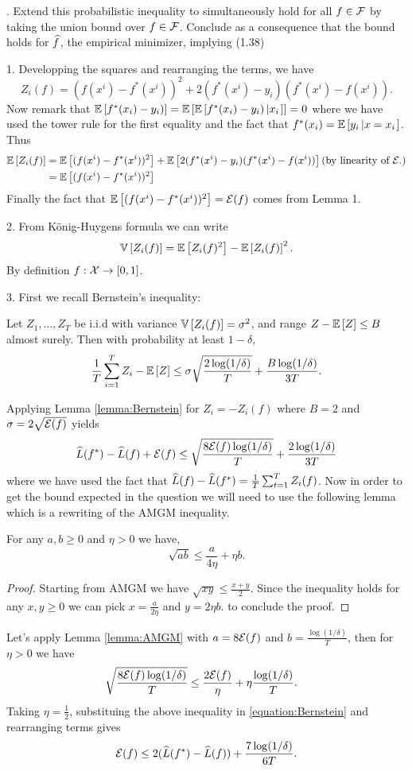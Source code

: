 . Extend this probabilistic inequality to simultaneously hold for all $f \in \mathcal{F}$ by taking the 
union bound over $f \in \mathcal{F}$. Conclude as a consequence that the bound holds for $\widehat f$, the empirical minimizer, implying (1.38)
\begin{solution}[]
1. Developping the squares and rearranging the terms, we have
   \[Z_i(f) = (f(x^i)-f^*(x^i))^2 +2(f^*(x^i)-y_i)(f^*(x^i)-f(x^i)).\] 
 Now remark that $\mathbb{E}\left[f^*(x_i)-y_i)\right]= \mathbb{E}\left[\mathbb{E}\left[f^*(x_i)-y_i)\left|x_i\right.\right]\right] = 0$ 
 where we have used the tower rule for the first equality and the fact that $f^*(x_i)=\mathbb{E}\left[y_i\left|x=x_i\right.\right]$.
Thus
\begin{align*}
    \mathbb{E}\left[Z_i(f)\right] &= \mathbb{E}\left[(f(x^i)-f^*(x^i))^2\right] + \mathbb{E}\left[2(f^*(x^i)-y_i)(f^*(x^i)-f(x^i))\right] \text{(by linearity of $\mathcal{E}{.}$)} \\
                &= \mathbb{E}\left[(f(x^i)-f^*(x^i))^2\right]
\end{align*}
Finally the fact that $\mathbb{E}\left[(f(x^i)-f^*(x^i))^2\right]= \mathcal{E}(f)$ comes from Lemma 1.

2. From König-Huygens formula we can write 
\[ \mathbb{V}\left[Z_i(f)\right]=\mathbb{E}\left[Z_i(f)^2\right]-\mathbb{E}\left[Z_i(f)\right]^2.\] 
By definition $f : \mathcal{X} \to [0,1]$.


3. First we recall Bernstein's inequality:
\begin{lemma}
    \label{lemma:Bernstein}
    Let $Z_1,\ldots,Z_T$ be i.i.d with variance $\mathbb{V}\left[Z_i(f)\right]=\sigma^2$, and range $Z-\mathbb{E}\left[Z\right]\leq B$ almost surely.
    Then with probability at least $1-\delta$,
    \[ \frac{1}{T}\sum_{i=1}^{T}Z_i -\mathbb{E}\left[Z\right]\leq \sigma\sqrt{\frac{2\log(1/\delta)}{T}}+\frac{B\log(1/\delta)}{3T}.\]
\end{lemma}
Applying Lemma \ref{lemma:Bernstein} for $Z_i=-Z_i(f)$ where $B= 2$ and $\sigma = 2\sqrt{\mathcal{E}(f)}$ yields    
\begin{equation}
    \label{equation:Bernstein}
    \widehat L(f^*)- \widehat L(f) + \mathcal{E}(f) \leq \sqrt{\frac{8\mathcal{E}(f)\log(1/\delta)}{T}}+\frac{2\log(1/\delta)}{3T}
\end{equation}
where we have used the fact that $\widehat L(f)-\widehat L(f^*) = \frac{1}{T}\sum_{t=1}^{T}Z_i(f)$.
Now in order to get the bound expected in the question we will need to use the following lemma which is a rewriting of the AMGM inequality.
\begin{lemma}
    \label{lemma:AMGM}
  For any $a,b\geq 0$ and $\eta >0$ we have,
  \[ \sqrt{ab} \leq \frac{a}{4\eta} +\eta b.\] 
\end{lemma}
\begin{proof}
    Starting from AMGM we have $\sqrt{xy} \leq \frac{x+y}{2}$.
    Since the inequality holds for any $x,y \geq 0$ we can pick $x = \frac{a}{2\eta}$ and $y=2\eta b$.
    to conclude the proof.
\end{proof}
Let's apply Lemma \ref{lemma:AMGM} with $a=8\mathcal{E}(f)$ and $b=\frac{\log(1/\delta)}{T}$, then for $\eta>0$ we have
\begin{align*}
    \sqrt{\frac{8\mathcal{E}(f)\log(1/\delta)}{T}}&\leq \frac{2\mathcal{E}(f)}{\eta} + \eta \frac{\log(1/\delta)}{T}.
\end{align*}
Taking $\eta=\frac{1}{2}$, substituing the above inequality in \ref{equation:Bernstein} and rearranging terms gives
\[ \mathcal{E}(f) \leq 2( \widehat L(f^*)- \widehat L(f))+\frac{7\log(1/\delta)}{6T}.\]


\end{solution}
